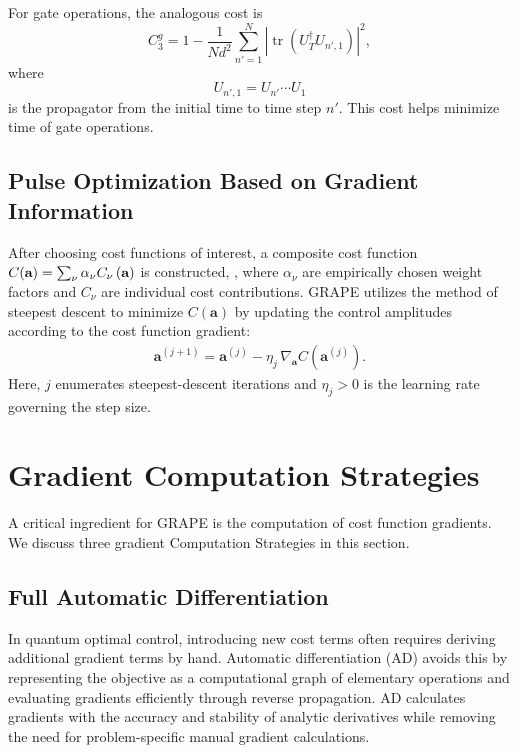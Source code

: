 For gate operations, the analogous cost is
\begin{equation}
C_3^{g}
=
1-\frac{1}{N d^2}\sum_{n'=1}^N
\left|
\operatorname{tr}\!\left(U_T^\dagger U_{n',1}\right)
\right|^2,
\end{equation}
where
\begin{equation}
U_{n',1}=U_{n'}\cdots U_1
\end{equation}
is the propagator from the initial time to time step $n'$. This cost helps minimize time of gate operations.

 
\subsection{Pulse Optimization Based on Gradient Information}
\label{subsec:pulse-opt-gradient}

After choosing cost functions of interest, a composite cost function $C(\textbf{a})=\sum_{\nu}\alpha_\nu C_\nu \left(\textbf{a}\right)$ is constructed, , where $\alpha_\nu$ are empirically chosen weight factors and $C_\nu$ are individual cost contributions. GRAPE utilizes the method of steepest descent to minimize $C(\textbf{a})$ by updating the control amplitudes according to the cost function gradient: 
\begin{align}
  \textbf{a}^{(j+1)}=\textbf{a}^{(j)}-\eta_j\,\nabla_{\textbf{a}}C(\textbf{a}^{(j)}).
\end{align}
Here, $j$ enumerates steepest-descent iterations and $\eta_j>0$ is the learning rate governing the step size.

\section{Gradient Computation Strategies}
\label{sec:gradient-strategies}
A critical ingredient for GRAPE is the computation of cost function gradients. We discuss three gradient Computation Strategies in this section.

\subsection{Full Automatic Differentiation}
\label{subsec:full-ad}

In quantum optimal control, introducing new cost terms often requires deriving additional gradient terms by hand. Automatic differentiation (AD) avoids this by representing the objective as a computational graph of elementary operations and evaluating gradients efficiently through reverse propagation. AD calculates gradients with the accuracy and stability of analytic derivatives while removing the need for problem-specific manual gradient calculations.

